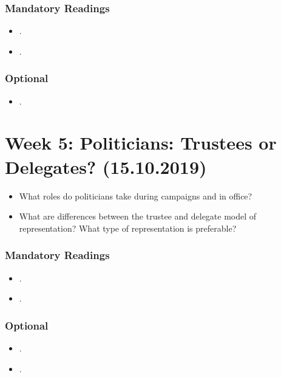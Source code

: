 \documentclass[abstract=on,parskip=full,headings=standardclasses,fontsize=11pt,paper=a4]{scrartcl}
\begin{document}
\subsubsection*{Mandatory Readings}
\begin{itemize}
\item {}.
\item {}.
\end{itemize}


\subsubsection*{Optional}
\begin{itemize}
\item {}.
\end{itemize}


\section{Week 5: Politicians: Trustees or Delegates? (15.10.2019)}


\begin{itemize}
\renewcommand\labelitemi{--}
\item What roles do politicians take during campaigns and in office? 
\item What are differences between the trustee and delegate model of representation? What type of representation is preferable?
\end{itemize}


\subsubsection*{Mandatory Readings}
\begin{itemize}
\item {}.
\item {}.
\end{itemize}


\subsubsection*{Optional}
\begin{itemize}
\item {}.
\item {}.
\end{itemize}
\end{document}
